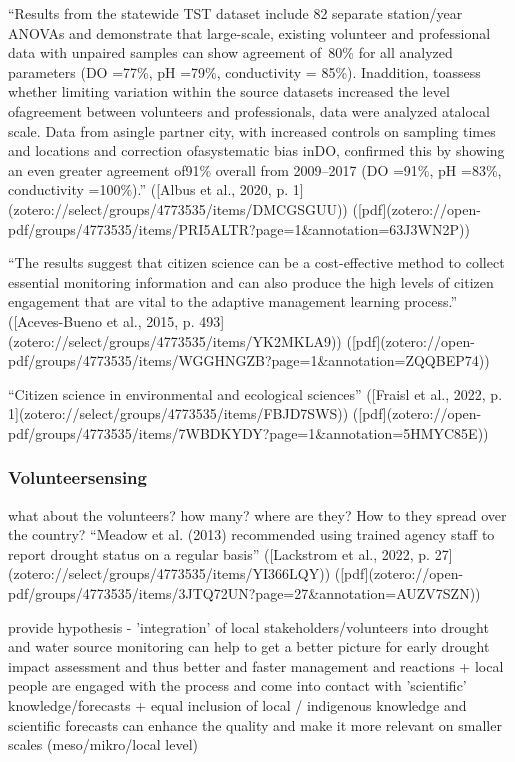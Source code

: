 {%
“Results from the statewide TST dataset include 82 separate station/year ANOVAs and demonstrate that large-scale, existing volunteer and professional data with unpaired samples can show agreement of~80\% for all analyzed parameters (DO =77\%, pH =79\%, conductivity = 85\%). Inaddition, toassess whether limiting variation within the source datasets increased the level ofagreement between volunteers and professionals, data were analyzed atalocal scale. Data from asingle partner city, with increased controls on sampling times and locations and correction ofasystematic bias inDO, confirmed this by showing an even greater agreement of91\% overall from 2009–2017 (DO =91\%, pH =83\%, conductivity =100\%).” ([Albus et al., 2020, p. 1](zotero://select/groups/4773535/items/DMCGSGUU)) ([pdf](zotero://open-pdf/groups/4773535/items/PRI5ALTR?page=1\&annotation=63J3WN2P))

“The results suggest that citizen science can be a cost-effective method to collect essential monitoring information and can also produce the high levels of citizen engagement that are vital to the adaptive management learning process.” ([Aceves-Bueno et al., 2015, p. 493](zotero://select/groups/4773535/items/YK2MKLA9)) ([pdf](zotero://open-pdf/groups/4773535/items/WGGHNGZB?page=1&annotation=ZQQBEP74))

“Citizen science in environmental and ecological sciences” ([Fraisl et al., 2022, p. 1](zotero://select/groups/4773535/items/FBJD7SWS)) ([pdf](zotero://open-pdf/groups/4773535/items/7WBDKYDY?page=1&annotation=5HMYC85E))
\subsubsection{Volunteersensing}
what about the volunteers? how many? where are they? How to they spread over the country?
“Meadow et al. (2013) recommended using trained agency staff to report drought status on a regular basis” ([Lackstrom et al., 2022, p. 27](zotero://select/groups/4773535/items/YI366LQY)) ([pdf](zotero://open-pdf/groups/4773535/items/3JTQ72UN?page=27\&annotation=AUZV7SZN))

provide hypothesis - 'integration' of local stakeholders/volunteers into drought and water source monitoring can help to get a better picture for early drought impact assessment and thus better and faster management and reactions
+ local people are engaged with the process and come into contact with 'scientific' knowledge/forecasts 
+ equal inclusion of local / indigenous knowledge and scientific forecasts can enhance the quality and make it more relevant on smaller scales (meso/mikro/local level)

}
